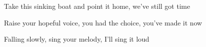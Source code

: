 \begin{song}
\bigskip

Take this sinking boat and point it home, we've still got time \par
{}Raise your hopeful voice, you had the choice, you've made it now \par
{}Falling slowly, sing your melody, I'll sing it loud \par
{}     \par
{}

\end{song}
